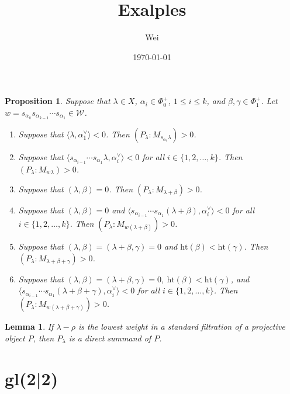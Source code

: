 \documentclass[12pt,a4paper]{article}
\title{Exalples  }
\author{Wei}
\date{\today}
\makeatletter
\renewcommand{\maketitle}{
    \begin{center}
        \vspace*{-1cm}  %
        {\LARGE\bfseries \@title \par}
        \vspace{0.2cm}  %
        {\large \@author }
        {\normalsize \@date \par}
        \vspace{1cm}    %
    \end{center}
}
\newtheorem{lemma}{Lemma}[theorem]
\newtheorem{proposition}{Proposition}[theorem]
\makeatother
\begin{document}
\maketitle
\begin{proposition} \label{prop:1}
Suppose that $\lambda \in X$, $\alpha_i \in \Phi_0^+$, $1 \leq i \leq k$, and $\beta, \gamma \in \Phi_1^+$. Let $w = s_{\alpha_k} s_{\alpha_{k-1}} \cdots s_{\alpha_1} \in \mathcal{W}$.

\begin{enumerate}
    \item Suppose that $\langle \lambda, \alpha_1^\vee \rangle < 0$. Then $(P_\lambda : M_{s_{\alpha_1}\lambda}) > 0$.
    
    \item Suppose that $\langle s_{\alpha_{i-1}} \cdots s_{\alpha_1} \lambda, \alpha_i^\vee \rangle < 0$ for all $i \in \{1,2,\ldots,k\}$. Then $(P_\lambda : M_{w\lambda}) > 0$.
    
    \item Suppose that $(\lambda, \beta) = 0$. Then $(P_\lambda : M_{\lambda + \beta}) > 0$.
    
    \item Suppose that $(\lambda, \beta) = 0$ and $\langle s_{\alpha_{i-1}} \cdots s_{\alpha_1} (\lambda + \beta), \alpha_i^\vee \rangle < 0$ for all $i \in \{1,2,\ldots,k\}$. Then $(P_\lambda : M_{w(\lambda + \beta)}) > 0$.
    
    \item Suppose that $(\lambda, \beta) = (\lambda + \beta, \gamma) = 0$ and $\mathrm{ht}(\beta) < \mathrm{ht}(\gamma)$. Then $(P_\lambda : M_{\lambda + \beta + \gamma}) > 0$.
    
    \item Suppose that $(\lambda, \beta) = (\lambda + \beta, \gamma) = 0$, $\mathrm{ht}(\beta) < \mathrm{ht}(\gamma)$, and $\langle s_{\alpha_{i-1}} \cdots s_{\alpha_1} (\lambda + \beta + \gamma), \alpha_i^\vee \rangle < 0$ for all $i \in \{1,2,\ldots,k\}$. Then $(P_\lambda : M_{w(\lambda + \beta + \gamma)}) > 0$.
\end{enumerate}
\end{proposition}
\begin{lemma}\label{lemma:2}
  If $\lambda - \rho$ is the lowest weight in a standard filtration of a projective object $P$, then $P_\lambda$ is a direct summand of $P$.
\end{lemma}

\section{gl(2|2)}
\end{document}
